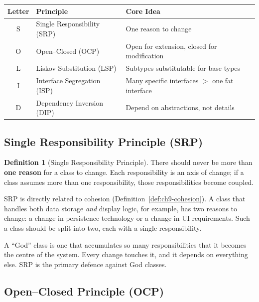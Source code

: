 \documentclass[11pt, a4paper, notitlepage]{report}
\theoremstyle{definition}
\newtheorem{definition}[theorem]{Definition}
\theoremstyle{remark}
\theoremstyle{definition}
\begin{document}
\begin{center}
\begin{tabular}{c l l}
  \toprule
  \textbf{Letter} & \textbf{Principle} & \textbf{Core Idea} \\
  \midrule
  S & Single Responsibility (SRP) & One reason to change \\
  O & Open--Closed (OCP) & Open for extension, closed for modification \\
  L & Liskov Substitution (LSP) & Subtypes substitutable for base types \\
  I & Interface Segregation (ISP) & Many specific interfaces $>$ one fat interface \\
  D & Dependency Inversion (DIP) & Depend on abstractions, not details \\
  \bottomrule
\end{tabular}
\end{center}

\subsection{Single Responsibility Principle (SRP)}
\label{subsec:ch9-srp}

\begin{definition}[Single Responsibility Principle]
\label{def:ch9-srp}
There should never be more than \textbf{one reason} for a class to change. Each
responsibility is an axis of change; if a class assumes more than one responsibility,
those responsibilities become coupled.
\end{definition}

SRP is directly related to cohesion (Definition~\ref{def:ch9-cohesion}). A class that
handles both data storage \emph{and} display logic, for example, has two reasons to
change: a change in persistence technology or a change in UI requirements. Such a class
should be split into two, each with a single responsibility.

\begin{warning}[title={Warning: Avoid ``God'' Classes}]
  A ``God'' class is one that accumulates so many responsibilities that it becomes the
  centre of the system. Every change touches it, and it depends on everything else.
  SRP is the primary defence against God classes.
\end{warning}

\subsection{Open--Closed Principle (OCP)}
\label{subsec:ch9-ocp}
\end{document}
